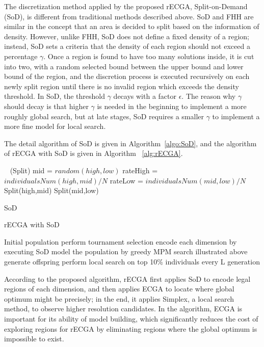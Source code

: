 The discretization method applied by the proposed rECGA, Split-on-Demand
(SoD), is different from traditional methods described above.  SoD and
FHH are similar in the concept that an area is decided to split based on
the information of density.  However, unlike FHH, SoD does not define a
fixed density of a region; instead, SoD sets a criteria that the density
of each region should not exceed a percentage $\gamma$.  Once a region
is found to have too many solutions inside, it is cut into two, with a
random selected bound between the upper bound and lower bound of the
region, and the discretion process is executed recursively on each newly
split region until there is no invalid region which exceeds the density
threshold.  In SoD, the threshold $\gamma$ decays with a factor
$\epsilon$.  The reason why $\gamma$ should decay is that higher
$\gamma$ is needed in the beginning to implement a more roughly global
search, but at late stages, SoD requires a smaller $\gamma$ to implement
a more fine model for local search. 

The detail algorithm of SoD is given in Algorithm~\ref{algo:SoD}, and
the algorithm of rECGA with SoD is given in Algorithm ~\ref{alg:rECGA}.
\begin{algorithm} \label{algo:SoD} {
    \  \Begin(Split) { mid = $random(high,low)$\; rateHigh
    =	$individualsNum(high,mid) / N$\; rateLow =
    $individualsNum(mid,low) /N$\;  {
    Split(high,mid)\;   }   { Split(mid,low)\;     }  } } \caption{SoD} \end{algorithm}

\begin{algorithm} \label{alg:rECGA} \caption{rECGA with SoD} Initial
  population\;  { perform tournament
    selection\; encode each dimension by executing SoD\; model the
    population by greedy MPM search illustrated above\; generate
  offspring\; perform local search on top 10\% individuals every L
generation } \end{algorithm} 

According to the proposed algorithm, rECGA first applies SoD to encode
legal regions of each dimension, and then applies ECGA to locate where
global optimum might be precisely; in the end, it applies Simplex, a
local search method, to observe higher resolution candidates.  In the
algorithm, ECGA is important for its ability of model building, which
significantly reduces the cost of exploring regions for rECGA by
eliminating regions where the global optimum is impossible to exist.

